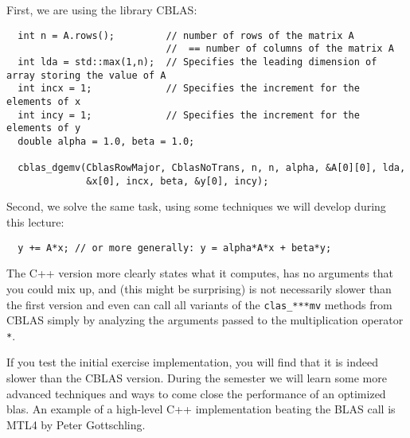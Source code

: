 First, we are using the library CBLAS:
%
\begin{verbatim}
  int n = A.rows();         // number of rows of the matrix A
                            //  == number of columns of the matrix A
  int lda = std::max(1,n);  // Specifies the leading dimension of array storing the value of A
  int incx = 1;             // Specifies the increment for the elements of x
  int incy = 1;             // Specifies the increment for the elements of y
  double alpha = 1.0, beta = 1.0;

  cblas_dgemv(CblasRowMajor, CblasNoTrans, n, n, alpha, &A[0][0], lda,
              &x[0], incx, beta, &y[0], incy);
\end{verbatim}
%
Second, we solve the same task, using some techniques we will develop during this lecture:
%
\begin{verbatim}
  y += A*x; // or more generally: y = alpha*A*x + beta*y;
\end{verbatim}

The C++ version more clearly states what it computes, has no arguments that you could mix up, and (this might be
surprising) is not necessarily slower than the first version and even can call all variants of the \texttt{clas\_***mv} methods
from CBLAS simply by analyzing the arguments passed to the multiplication operator \texttt{*}.

\begin{rem}
  If you test the initial exercise implementation, you will find that it is indeed slower than the CBLAS version. During the semester
  we will learn some more advanced techniques and ways to come close the performance of an optimized blas. An example of a high-level
  C++ implementation beating the BLAS call is MTL4 by Peter Gottschling.
\end{rem}

